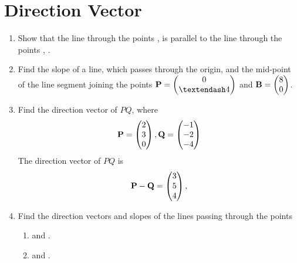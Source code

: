 \documentclass[journal,12pt,twocolumn]{IEEEtran}
\renewcommand\thesection{\arabic{section}}
\begin{document}
\section{Direction Vector}
\renewcommand{\theequation}{\theenumi}
\begin{enumerate}[label=\thesection.\arabic*.,ref=\thesection.\theenumi]
\item Show that the line through the points ,  is parallel to the line through the points   , .
\\
\solution 

\item  Find the slope of a line, which passes through the origin, and the mid-point of the line segment joining the points $\vec{P} = \myvec{0\\ – 4}$ and $\mathbf{B} = \begin{pmatrix}8\\ 0\end{pmatrix}$.
\\
	\solution 

\item Find the direction vector of $PQ$, where 
\begin{align}
\mathbf{P} = \begin{pmatrix}2\\3\\0\end{pmatrix},
\mathbf{Q} = \begin{pmatrix}-1\\-2\\-4\end{pmatrix}
\end{align}
%
\solution The direction vector of $PQ$ is 
%
\begin{align}
\mathbf{P}-\mathbf{Q} = \begin{pmatrix}3\\5\\4\end{pmatrix},
\end{align}
%
\item Find the direction vectors and slopes of the lines passing through the points
%
\begin{enumerate}
\item {} and .
\item {} and .

\end{enumerate}
\end{enumerate}
\end{document}
